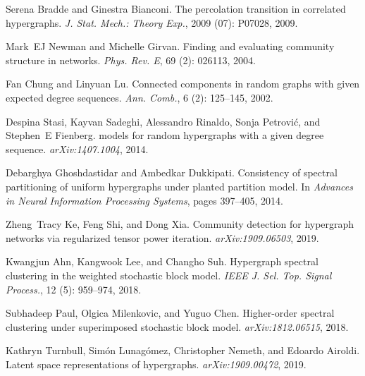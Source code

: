 Serena Bradde and Ginestra Bianconi.
\newblock The percolation transition in correlated hypergraphs.
\newblock \emph{J. Stat. Mech.: Theory Exp.}, 2009 (07):
P07028, 2009.

Mark~EJ Newman and Michelle Girvan.
\newblock Finding and evaluating community structure in networks.
\newblock \emph{Phys. Rev. E}, 69 (2): 026113, 2004.

Fan Chung and Linyuan Lu.
\newblock Connected components in random graphs with given expected degree
sequences.
\newblock \emph{Ann. Comb.}, 6 (2): 125--145, 2002.

Despina Stasi, Kayvan Sadeghi, Alessandro Rinaldo, Sonja Petrovi{\'c}, and
Stephen~E Fienberg.
\newblock {{$\beta$}} models for random hypergraphs with a given degree
sequence.
\newblock \emph{arXiv:1407.1004}, 2014.

Debarghya Ghoshdastidar and Ambedkar Dukkipati.
\newblock Consistency of spectral partitioning of uniform hypergraphs under
planted partition model.
\newblock In \emph{Advances in Neural Information Processing Systems}, pages
397--405, 2014.

Zheng~Tracy Ke, Feng Shi, and Dong Xia.
\newblock Community detection for hypergraph networks via regularized tensor
power iteration.
\newblock \emph{arXiv:1909.06503}, 2019.

Kwangjun Ahn, Kangwook Lee, and Changho Suh.
\newblock Hypergraph spectral clustering in the weighted stochastic block
model.
\newblock \emph{IEEE J. Sel. Top. Signal Process.}, 12 (5):
959--974, 2018.

Subhadeep Paul, Olgica Milenkovic, and Yuguo Chen.
\newblock Higher-order spectral clustering under superimposed stochastic block
model.
\newblock \emph{arXiv:1812.06515}, 2018.

Kathryn Turnbull, Sim{\'o}n Lunag{\'o}mez, Christopher Nemeth, and Edoardo
Airoldi.
\newblock Latent space representations of hypergraphs.
\newblock \emph{arXiv:1909.00472}, 2019.

